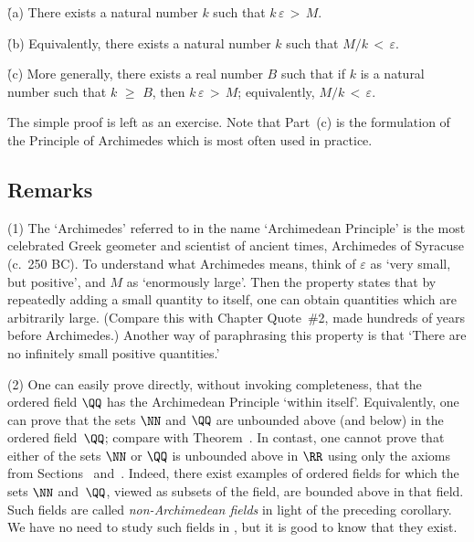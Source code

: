 \V

         \h (a) There exists a natural number $k$ such that $k\,{\varepsilon}\,>\,M$.


\V

        \h (b) Equivalently, there exists a natural number $k$ such that $M/k\,<\,{\varepsilon}$.

\V

        \h (c) More generally, there exists a real number $B$ such that if $k$ is a natural number such that $k\,\,{\geq}\,\,B$, then $k\,{\varepsilon}\,>\,M$;
    equivalently, $M/k\,<\,{\varepsilon}$.

\V

        The simple proof is left as an exercise. Note that Part~(c) is the formulation
    of the Principle of Archimedes which is most often used in practice.


\V
\V

            \subsection{\small{\bf Remarks}}
            \label{RemrkB30.50}

\hspace*{\parindent}(1) The `Archimedes' referred to in the name `Archimedean Principle'
    is the most celebrated  Greek geometer and scientist of ancient times, Archimedes of Syracuse (c.~250 BC).
    To understand what Archimedes means, think of ${\varepsilon}$ as `very small, but positive', and $M$ as `enormously large'.
    Then the property states that by repeatedly adding a small quantity to itself, one can obtain quantities which are arbitrarily large.
    (Compare this with Chapter Quote~\#2, made hundreds of years before Archimedes.)
    Another way of paraphrasing this property is that `There are no infinitely small positive quantities.'


\V

        (2) One can easily prove directly, without invoking completeness, that the ordered field ${\QQ}$ has the Archimedean Principle `within itself'.
    Equivalently, one can prove that the sets ${\NN}$ and ${\QQ}$ are unbounded above (and below) in the ordered field~${\QQ}$;
    compare with Theorem~.
    In contast, one cannot prove that either of the sets ${\NN}$ or ${\QQ}$ is unbounded above
    in ${\RR}$ using only the axioms from Sections~ and~.
    Indeed, there exist examples of ordered fields for which the sets ${\NN}$ and~${\QQ}$, viewed as subsets of the field, are bounded above in that field. 
    Such fields are called {\em non-Archimedean fields} in light of the preceding corollary.
    We have no need to study such fields in {\ThisText}, but it is good to know that they exist.

